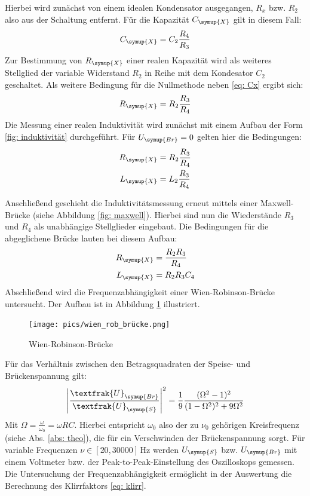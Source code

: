 Hierbei wird zunächst von einem idealen Kondensator ausgegangen, $R_x$ bzw. $R_2$ also aus der Schaltung entfernt. Für die
Kapazität $C_{\symup{X}}$ gilt in diesem Fall:
\begin{equation}
  C_{\symup{X}} = C_2 \frac{R_4}{R_3}
  \label{eq: Cx}
\end{equation}
Zur Bestimmung von $R_{\symup{X}}$ einer realen Kapazität wird als weiteres Stellglied der variable Widerstand $R_2$ in Reihe mit dem Kondesator $C_2$
geschaltet. Als weitere Bedingung für die Nullmethode neben \eqref{eq: Cx} ergibt sich:
\begin{equation}
  R_{\symup{X}} = R_2\frac{R_3}{R_4}
  \label{eq: Rx}
\end{equation}
Die Messung einer realen Induktivität wird zunächst mit einem Aufbau der Form \ref{fig: induktivität} durchgeführt.
Für $U_{\symup{Br}} = 0$ gelten hier die Bedingungen:
\begin{align}
  \begin{aligned}
    R_{\symup{X}} &= R_2\frac{R_3}{R_4} \\
    L_{\symup{X}} &= L_2\frac{R_3}{R_4}
  \end{aligned}
  \label{eq: Lx}
\end{align}

Anschließend geschieht die Induktivitätsmessung erneut mittels einer Maxwell-Brücke (siehe Abbildung \ref{fig: maxwell}).
Hierbei sind nun die Wiederstände $R_3$ und $R_4$ als unabhängige Stellglieder eingebaut. Die Bedingungen für die abgeglichene Brücke lauten
bei diesem Aufbau:
\begin{align}
  \begin{aligned}
    R_{\symup{X}} &=\frac{R_2 R_3}{R_4} \\
    L_{\symup{X}} &= R_2 R_3 C_4
  \end{aligned}
  \label{eq: Lx_maxwell}
\end{align}
Abschließend wird die Frequenzabhängigkeit einer Wien-Robinson-Brücke untersucht. Der Aufbau ist in Abbildung
 \ref{fig: wienrob} illustriert.
\begin{figure}
  \centering
  \texttt{[image: pics/wien\_rob\_brücke.png]}
  \caption{Wien-Robinson-Brücke\cite{anleitung302}}
  \label{fig: wienrob}
\end{figure}
Für das Verhältnis zwischen den Betragsquadraten der Speise- und Brückenspannung gilt:
\begin{equation}
  \left| \frac{\textfrak{U}_{\symup{Br}}}{\textfrak{U}_{\symup{S}}}\right|^2 = \frac{1}{9} \frac{(\Omega^2 - 1)^2 }{(1 - \Omega ^2)^2 + 9 \Omega ^2}
\end{equation}
Mit $\Omega = \frac{\omega}{\omega_0} = \omega R C$. Hierbei entspricht $\omega_0$ also der zu $\nu_0$ gehörigen Kreisfrequenz (siehe Abs. \ref{abs: theo}), die
für ein Verschwinden der Brückenspannung sorgt. Für variable Frequenzen $\nu \in [20, \num{30000}]\,\si{\hertz}$ werden $U_{\symup{S}}$ bzw. $U_{\symup{Br}}$ mit einem
Voltmeter bzw. der Peak-to-Peak-Einstellung des Oszilloskops gemessen. Die Untersuchung der Frequenzabhängigkeit
 ermöglicht in der Auswertung die Berechnung des Klirrfaktors \eqref{eq: klirr}.

